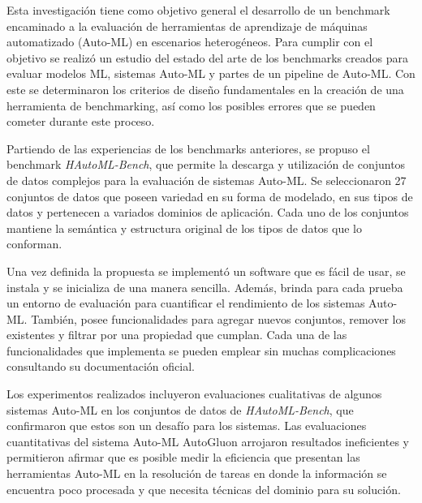 \begin{conclusions}
Esta investigación tiene como objetivo general el desarrollo de un benchmark encaminado a la evaluación de herramientas de aprendizaje de máquinas automatizado (Auto-ML) 
en escenarios heterogéneos. 
Para cumplir con el objetivo se realizó un estudio del estado del arte de los benchmarks creados para evaluar modelos ML, sistemas Auto-ML y 
partes de un pipeline de Auto-ML. Con este se determinaron los criterios de diseño fundamentales en la creación de una herramienta de benchmarking, así como los posibles 
errores que se pueden cometer durante este proceso.

Partiendo de las experiencias de los benchmarks anteriores, se propuso el benchmark \textit{HAutoML-Bench}, que permite la descarga y utilización de conjuntos de datos complejos 
para la evaluación de sistemas Auto-ML. Se seleccionaron 27 conjuntos de datos que poseen variedad en su forma de modelado, en sus tipos de datos y pertenecen a variados 
dominios de aplicación. Cada uno de los conjuntos mantiene la semántica y estructura original de los tipos de datos que lo conforman. 

Una vez definida la propuesta se implementó un software que es fácil de usar, se instala y se inicializa de una manera sencilla. Además, brinda para cada prueba un 
entorno de evaluación para cuantificar el rendimiento de los sistemas Auto-ML. También, posee funcionalidades para agregar nuevos conjuntos, remover los existentes y 
filtrar por una propiedad que cumplan. Cada una de las funcionalidades que implementa se pueden emplear sin muchas complicaciones consultando su documentación oficial.

Los experimentos realizados incluyeron evaluaciones cualitativas de algunos sistemas Auto-ML en los conjuntos de datos de \textit{HAutoML-Bench}, que confirmaron que 
estos son un desafío para los sistemas. Las evaluaciones cuantitativas del sistema Auto-ML AutoGluon arrojaron resultados ineficientes y permitieron afirmar 
que es posible medir la eficiencia que presentan las herramientas Auto-ML en la resolución de tareas en donde la información se encuentra poco procesada y que 
necesita técnicas del dominio para su solución.






\end{conclusions}
